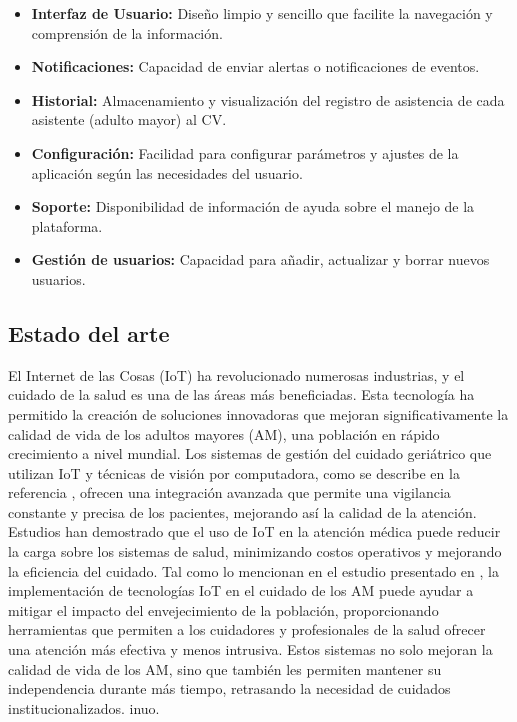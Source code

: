 \begin{itemize}

     \item \textbf{Interfaz de Usuario:} Diseño limpio y sencillo que facilite la navegación y comprensión de la información.
     \item \textbf{Notificaciones:} Capacidad de enviar alertas o notificaciones de eventos.
     \item \textbf{Historial:} Almacenamiento y visualización del registro de asistencia de cada asistente (adulto mayor) al CV.
     \item \textbf{Configuración:} Facilidad para configurar parámetros y ajustes de la aplicación según las necesidades del usuario.
     \item \textbf{Soporte: }Disponibilidad de información de ayuda sobre el manejo de la plataforma.
     \item \textbf{Gestión de usuarios: } Capacidad para añadir, actualizar y borrar nuevos usuarios.
\end{itemize}


\subsection{Estado del arte}


El Internet de las Cosas (IoT) ha revolucionado numerosas industrias, y el cuidado de la salud es una de las áreas más beneficiadas. Esta tecnología ha permitido la creación de soluciones innovadoras que mejoran significativamente la calidad de vida de los adultos mayores (AM), una población en rápido crecimiento a nivel mundial. Los sistemas de gestión del cuidado geriátrico que utilizan IoT y técnicas de visión por computadora, como se describe en la referencia \cite{1}, ofrecen una integración avanzada que permite una vigilancia constante y precisa de los pacientes, mejorando así la calidad de la atención. Estudios han demostrado que el uso de IoT en la atención médica puede reducir la carga sobre los sistemas de salud, minimizando costos operativos y mejorando la eficiencia del cuidado. Tal como lo mencionan en el estudio presentado en \cite{3}, la implementación de tecnologías IoT en el cuidado de los AM puede ayudar a mitigar el impacto del envejecimiento de la población, proporcionando herramientas que permiten a los cuidadores y profesionales de la salud ofrecer una atención más efectiva y menos intrusiva. Estos sistemas no solo mejoran la calidad de vida de los AM, sino que también les permiten mantener su independencia durante más tiempo, retrasando la necesidad de cuidados institucionalizados.\hfill \break
inuo.\hfill \break

